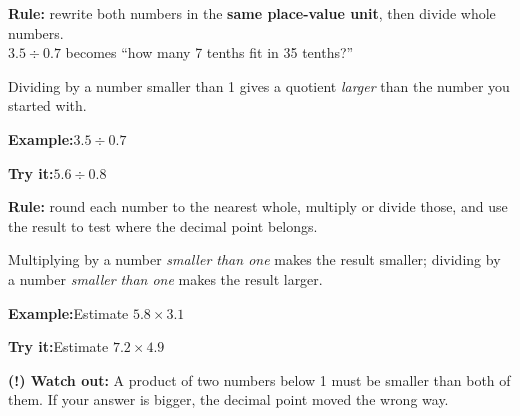 \documentclass[12pt]{article}
\begin{document}
\begin{formulabox}\textbf{Rule:} rewrite both numbers in the \textbf{same place-value unit}, then divide whole numbers.\\[4pt]
$3.5 \div 0.7$ becomes ``how many 7 tenths fit in 35 tenths?''\par
Dividing by a number smaller than 1 gives a quotient \emph{larger} than the number you started with.
\end{formulabox}
\begin{examplebox}\textbf{Example:}\quad $3.5 \div 0.7$
\end{examplebox}
\begin{tryitbox}\textbf{Try it:}\quad $5.6 \div 0.8$\\[2pt]
\end{tryitbox}

\begin{formulabox}\textbf{Rule:} round each number to the nearest whole, multiply or divide those, and use the result to test where the decimal point belongs.\par
Multiplying by a number \emph{smaller than one} makes the result smaller;
dividing by a number \emph{smaller than one} makes the result larger.
\end{formulabox}
\begin{examplebox}\textbf{Example:}\quad Estimate $5.8 \times 3.1$
\end{examplebox}
\begin{tryitbox}\textbf{Try it:}\quad Estimate $7.2 \times 4.9$\\[2pt]
\end{tryitbox}

\begin{watchoutbox}\textbf{(!) Watch out:} A product of two numbers below 1 must be
smaller than both of them. If your answer is bigger, the decimal point moved the wrong way.
\end{watchoutbox}
\end{document}
